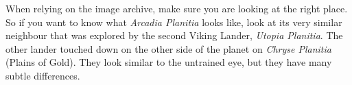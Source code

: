 When relying on the image archive, make sure you are looking at the right place. So if you want to know what {\it Arcadia Planitia} looks like, look at its very similar neighbour that was explored by the second Viking Lander, {\it Utopia Planitia}. The other lander touched down on the other side of the planet on {\it Chryse Planitia} (Plains of Gold). They look similar to the untrained eye, but they have many subtle differences.

\StopChapter

